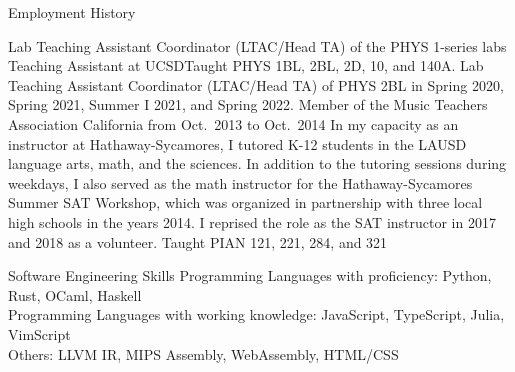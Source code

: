 \documentclass{cv}
\begin{document}
\begin{block}{Employment History}
  \begin{entries}
      {Lab Teaching Assistant Coordinator (LTAC/Head TA) of the PHYS 1-series
      labs}
      {Teaching Assistant at UCSD}{Taught PHYS 1BL, 2BL, 2D, 10, and 140A. Lab
      Teaching Assistant Coordinator (LTAC/Head TA) of PHYS 2BL in Spring 2020,
      Spring 2021, Summer I 2021, and Spring 2022.}
      {Member of the Music Teachers Association California from Oct.\ 2013 to Oct.\ 2014}
      {In my capacity as an instructor at Hathaway-Sycamores, I tutored K-12
      students in the LAUSD language arts, math, and the sciences. In addition
      to the tutoring sessions during weekdays, I also served as the math
      instructor for the Hathaway-Sycamores Summer SAT Workshop, which was
      organized in partnership with three local high schools in the years
      2014. I reprised the role as the SAT instructor in 2017 and
      2018 as a volunteer.}
      {Taught PIAN 121, 221, 284, and 321}
  \end{entries}
\end{block}

\begin{block}{Software Engineering Skills}
  Programming Languages with proficiency: Python, Rust, OCaml, Haskell\\
  Programming Languages with working knowledge: JavaScript, TypeScript, Julia, VimScript\\
  Others: LLVM IR, MIPS Assembly, WebAssembly, HTML/CSS
\end{block}

\begin{refsection}[papers]
  \nocite{*}
  \printbibliography[title=Peer Reviewed Publications]
\end{refsection}

\begin{refsection}[talks]
  \nocite{*}
  \printbibliography[title=Talks and Presentations]
\end{refsection}
\end{document}
